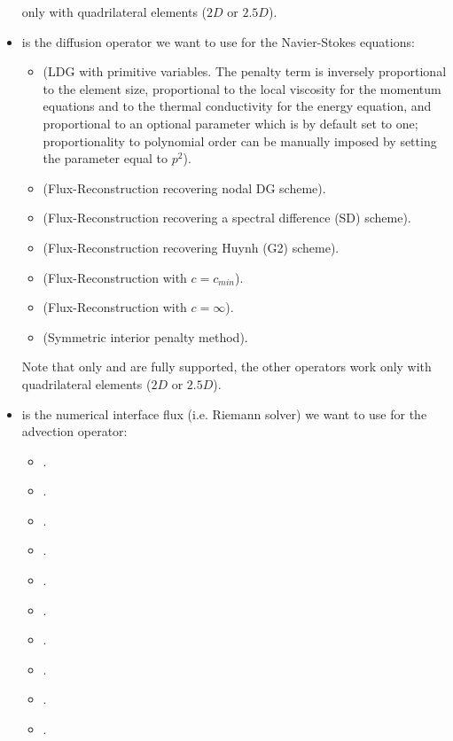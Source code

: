 \begin{itemize}
    only with quadrilateral elements ($2D$ or $2.5D$).
  \item {} is the diffusion operator we want to use
    for the Navier-Stokes equations:
    \begin{itemize}
      \item {} (LDG with primitive variables. The penalty term is inversely
      proportional to the element size, proportional to the local viscosity for the
      momentum equations and to the thermal conductivity for the energy equation,
      and proportional to an optional parameter  which is by default
      set to one; proportionality to polynomial order can be manually imposed by setting
      the parameter  equal to $p^2$).
      \item {} (Flux-Reconstruction recovering nodal DG scheme).
      \item {} (Flux-Reconstruction recovering a spectral difference (SD) scheme).
      \item {} (Flux-Reconstruction recovering Huynh (G2) scheme).
      \item {} (Flux-Reconstruction with $c = c_{min}$).
      \item {} (Flux-Reconstruction with $c = \infty$).
      \item {} (Symmetric interior penalty method).
    \end{itemize}
    Note that only  and  are fully supported, the other operators work only
    with quadrilateral elements ($2D$ or $2.5D$).
  \item {} is the numerical interface flux (i.e. Riemann solver)
    we want to use for the advection operator:
    \begin{itemize}
      \item {}.
      \item {}.
      \item {}.
      \item {}.
      \item {}.
      \item {}.
      \item {}.
      \item {}.
      \item {}.
      \item {}.

\end{itemize}
\end{itemize}
